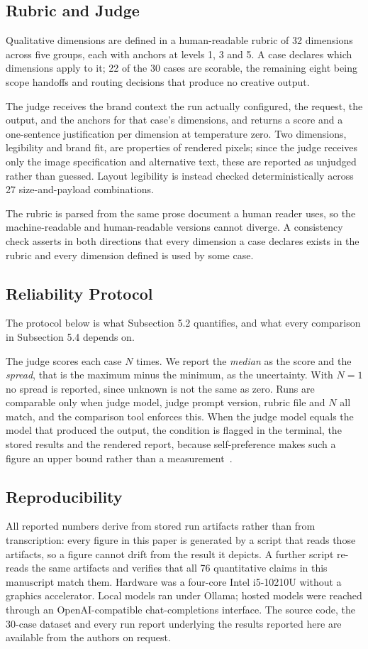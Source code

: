 \documentclass[9pt,twocolumn]{extarticle}
\begin{document}
\subsection{Rubric and Judge}
Qualitative dimensions are defined in a human-readable rubric of 32 dimensions
across five groups, each with anchors at levels 1, 3 and 5. A case declares
which dimensions apply to it; 22 of the 30 cases are scorable, the remaining
eight being scope handoffs and routing decisions that produce no creative
output.

The judge receives the brand context the run actually configured, the request,
the output, and the anchors for that case's dimensions, and returns a score and
a one-sentence justification per dimension at temperature zero. Two dimensions,
legibility and brand fit, are properties of rendered pixels; since the judge
receives only the image specification and alternative text, these are reported
as unjudged rather than guessed. Layout legibility is instead checked
deterministically across 27 size-and-payload combinations.

The rubric is parsed from the same prose document a human reader uses, so the
machine-readable and human-readable versions cannot diverge. A consistency
check asserts in both directions that every dimension a case declares exists in
the rubric and every dimension defined is used by some case.

\subsection{Reliability Protocol}
\label{sec:protocol}
The protocol below is what Subsection 5.2 quantifies, and what every comparison
in Subsection 5.4 depends on.

The judge scores each case $N$ times. We report the \textit{median} as the
score and the \textit{spread}, that is the maximum minus the minimum, as the
uncertainty. With $N=1$ no spread is reported, since unknown is not the same as
zero. Runs are comparable only when judge model, judge prompt version, rubric
file and $N$ all match, and the comparison tool enforces this. When the judge
model equals the model that produced the output, the condition is flagged in
the terminal, the stored results and the rendered report, because
self-preference makes such a figure an upper bound rather than a
measurement~\cite{panickssery2024selfpref}.

\subsection{Reproducibility}
All reported numbers derive from stored run artifacts rather than from
transcription: every figure in this paper is generated by a script that reads
those artifacts, so a figure cannot drift from the result it depicts. A further
script re-reads the same artifacts and verifies that all 76 quantitative claims
in this manuscript match them. Hardware was a four-core Intel i5-10210U without
a graphics accelerator. Local models ran under Ollama; hosted models were
reached through an OpenAI-compatible chat-completions interface. The source
code, the 30-case dataset and every run report underlying the results reported
here are available from the authors on request.
\end{document}
